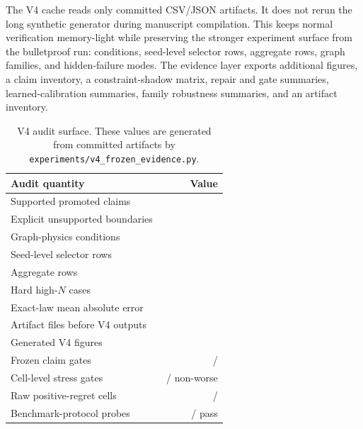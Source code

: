\documentclass{article}
\begin{document}
The V4 cache reads only committed CSV/JSON artifacts.  It does not rerun the
long synthetic generator during manuscript compilation.  This keeps normal
verification memory-light while preserving the stronger experiment surface from
the bulletproof run: \VFourGraphConditions{} conditions,
\VFourGraphSeedRows{} seed-level selector rows, \VFourGraphMainRows{}
aggregate rows, \VFourGraphFamilies{} graph families, and
\VFourGraphHiddenFailures{} hidden-failure modes.  The evidence layer exports
\VFourGraphFigures{} additional figures, a claim inventory, a constraint-shadow
matrix, repair and gate summaries, learned-calibration summaries, family
robustness summaries, and an artifact inventory.

\begin{table}[t]
\caption{V4 audit surface.  These values are generated from committed artifacts
by \texttt{experiments/v4\_frozen\_evidence.py}.}
\label{tab:V4-audit-surface}
\begin{center}
\small
\begin{tabular}{@{}p{0.70\linewidth}r@{}}
\toprule
Audit quantity & Value \\
\midrule
Supported promoted claims & \VFourGraphSupportedClaims{} \\
Explicit unsupported boundaries & \VFourGraphUnsupportedBoundaries{} \\
Graph-physics conditions & \VFourGraphConditions{} \\
Seed-level selector rows & \VFourGraphSeedRows{} \\
Aggregate rows & \VFourGraphMainRows{} \\
Hard high-\(N\) cases & \VFourGraphHardCases{} \\
Exact-law mean absolute error & \VFourGraphExactError{} \\
Artifact files before V4 outputs & \VFourGraphArtifactFiles{} \\
Generated V4 figures & \VFourGraphFigures{} \\
Frozen claim gates & \VFourGraphClaimGatesPassed{}/\VFourGraphClaimGatesTotal{} \\
Cell-level stress gates & \VFourGraphAdaptiveNonworseCells{}/\VFourGraphCellRows{} non-worse \\
Raw positive-regret cells & \VFourGraphRawPositiveCells{}/\VFourGraphCellRows{} \\
Benchmark-protocol probes & \VFourGraphBenchmarkPassRows{}/\VFourGraphBenchmarkRows{} pass \\
\bottomrule
\end{tabular}
\end{center}
\end{table}
\end{document}
